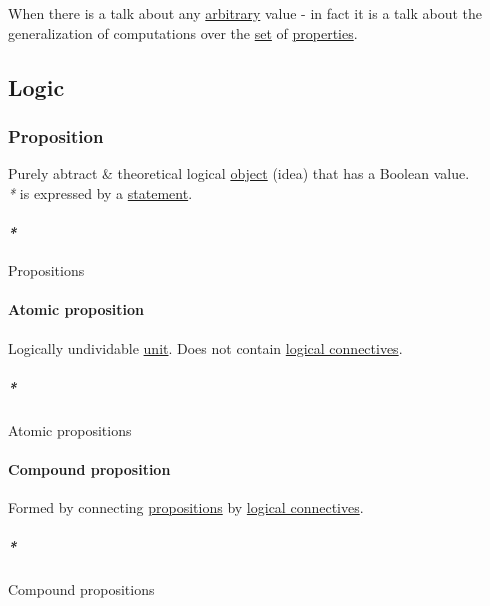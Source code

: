 \documentclass[11pt]{article}
\begin{document}
When there is a talk about any \hyperref[orgbfdf9b7]{arbitrary} value - in fact it is a talk about the generalization of computations over the \hyperref[orgbed80ba]{set} of \hyperref[org763ad6b]{properties}.\\

\subsection{Logic}
\label{sec:org180023b}
\subsubsection{\label{org78bac32}Proposition}
\label{sec:org66b0a86}
Purely abtract \& theoretical logical \hyperref[org025aac8]{object} (idea) that has a Boolean value.\\

\emph{*} is expressed by a \hyperref[org0fdd00d]{statement}.\\

\paragraph{\emph{*}}
\label{sec:org0f027b7}

\label{org4320b73}Propositions\\

\paragraph{\label{orge5e677e}Atomic proposition}
\label{sec:orga033580}
Logically undividable \hyperref[org2833f3f]{unit}. Does not contain \hyperref[org244a341]{logical connectives}.\\

\subparagraph{\emph{*}}
\label{sec:org81a5b49}

\label{orge2b30c4}Atomic propositions\\

\paragraph{\label{org3d5c706}Compound proposition}
\label{sec:org8f3fc75}
Formed by connecting \hyperref[org4320b73]{propositions} by \hyperref[org244a341]{logical connectives}.\\

\subparagraph{\emph{*}}
\label{sec:org47f695a}

\label{orga1ca308}Compound propositions\\
\end{document}
